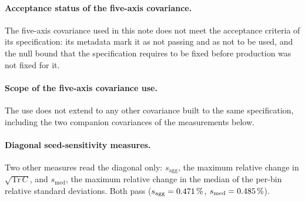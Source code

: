 \paragraph{Acceptance status of the five-axis covariance.} The five-axis covariance used in this note does not meet the acceptance criteria of its specification: its metadata mark it as not passing and as not to be used, and the null bound that the specification requires to be fixed before production was not fixed for it.

\paragraph{Scope of the five-axis covariance use.} The use does not extend to any other covariance built to the same specification, including the two companion covariances of the measurements below.

\paragraph{Diagonal seed-sensitivity measures.} Two other measures read the diagonal only: $s_{\mathrm{agg}}$, the maximum relative change in $\sqrt{\mathrm{Tr}\,C}$, and $s_{\mathrm{med}}$, the maximum relative change in the median of the per-bin relative standard deviations. Both pass ($s_{\mathrm{agg}}=0.471\,\%$, $s_{\mathrm{med}}=0.485\,\%$).

